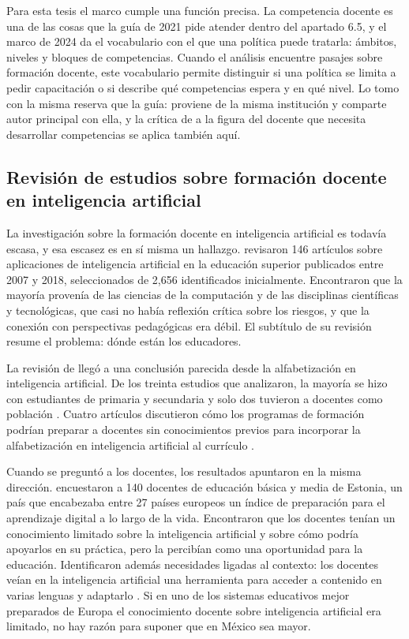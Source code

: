 Para esta tesis el marco cumple una función precisa. La competencia docente es una de las
cosas que la guía de 2021 pide atender dentro del apartado 6.5, y el marco de 2024 da el
vocabulario con el que una política puede tratarla: ámbitos, niveles y bloques de
competencias. Cuando el análisis encuentre pasajes sobre formación docente, este vocabulario
permite distinguir si una política se limita a pedir capacitación o si describe qué
competencias espera y en qué nivel. Lo tomo con la misma reserva que la guía: proviene de la
misma institución y comparte autor principal con ella, y la crítica de
\citet{mochizuki2025ethics} a la figura del docente que necesita desarrollar competencias
se aplica también aquí.

\subsection{Revisión de estudios sobre formación docente en inteligencia artificial}
\label{subsec:mt-formacion}

La investigación sobre la formación docente en inteligencia artificial es todavía escasa, y
esa escasez es en sí misma un hallazgo. \citet{zawacki2019systematic} revisaron 146
artículos sobre aplicaciones de inteligencia artificial en la educación superior publicados
entre 2007 y 2018, seleccionados de 2{,}656 identificados inicialmente. Encontraron que la
mayoría provenía de las ciencias de la computación y de las disciplinas científicas y
tecnológicas, que casi no había reflexión crítica sobre los riesgos, y que la conexión con
perspectivas pedagógicas era débil. El subtítulo de su revisión resume el problema: dónde
están los educadores.

La revisión de \citet{ng2021ailiteracy} llegó a una conclusión parecida desde la
alfabetización en inteligencia artificial. De los treinta estudios que analizaron, la
mayoría se hizo con estudiantes de primaria y secundaria y solo dos tuvieron a docentes como
población \citep[p.~3]{ng2021ailiteracy}. Cuatro artículos discutieron cómo los programas
de formación podrían preparar a docentes sin conocimientos previos para incorporar la
alfabetización en inteligencia artificial al currículo \citep[p.~7]{ng2021ailiteracy}.

Cuando se preguntó a los docentes, los resultados apuntaron en la misma dirección.
\citet{chounta2022teachers} encuestaron a 140 docentes de educación básica y media de
Estonia, un país que encabezaba entre 27 países europeos un índice de preparación para el
aprendizaje digital a lo largo de la vida. Encontraron que los docentes tenían un
conocimiento limitado sobre la inteligencia artificial y sobre cómo podría apoyarlos en su
práctica, pero la percibían como una oportunidad para la educación. Identificaron además
necesidades ligadas al contexto: los docentes veían en la inteligencia artificial una
herramienta para acceder a contenido en varias lenguas y adaptarlo
\citep[p.~725]{chounta2022teachers}. Si en uno de los sistemas educativos mejor preparados
de Europa el conocimiento docente sobre inteligencia artificial era limitado, no hay razón
para suponer que en México sea mayor.

